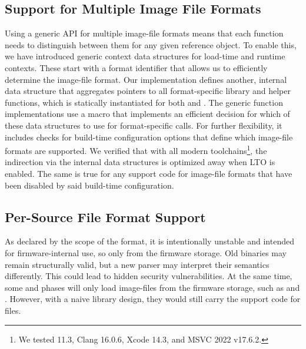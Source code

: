 \subsection{Support for Multiple Image File Formats}
\label{sec:multi-format}

Using a generic \gls{API} for multiple \gls{image-file} formats means that each function needs to distinguish between them for any given reference object. To enable this, we have introduced generic context data structures for load-time and runtime contexts. These start with a format identifier that allows us to efficiently determine the \gls{image-file} format. Our implementation defines another, internal data structure that aggregates pointers to all format-specific \gls{library} and helper functions, which is statically instantiated for both  and . The generic function implementations use a macro that implements an efficient decision for which of these data structures to use for format-specific calls. For further flexibility, it includes checks for build-time configuration options that define which \gls{image-file} formats are supported. We verified that with all modern toolchains\footnote{We tested  11.3, Clang 16.0.6, Xcode 14.3, and \gls{MSVC} 2022 v17.6.2.}, the indirection via the internal data structures is optimized away when \gls{LTO} is enabled. The same is true for any support code for \gls{image-file} formats that have been disabled by said build-time configuration.

\subsection{Per-Source File Format Support}
\label{sec:multi-source}

As declared by the scope of the  format, it is intentionally unstable and intended for \gls{firmware}-internal use, so only from the \gls{firmware} storage. Old  binaries may remain structurally valid, but a new parser may interpret their semantics differently. This could lead to hidden security vulnerabilities. At the same time, some  and  phases will only load \glspl{image-file} from the \gls{firmware} storage, such as  and . However, with a naive \gls{library} design, they would still carry the support code for  files.

